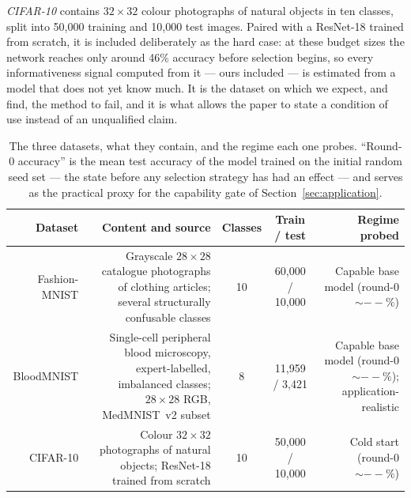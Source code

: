 \documentclass[a4paper,fleqn,longmktitle]{cas-sc}
\providecommand{\FmnistRoundZero}{--}\providecommand{\BloodRoundZero}{--}
\providecommand{\CifarRoundZero}{--}\providecommand{\CifarAccLow}{--}
\begin{document}
\emph{CIFAR-10} \citep{krizhevsky2009} contains $32\times32$ colour
photographs of natural objects in ten classes, split into 50,000
training and 10,000 test images. Paired with a ResNet-18
\citep{he2016} trained from scratch, it is included deliberately as the
hard case: at these budget sizes the network reaches only around 46\%
accuracy before selection begins, so every informativeness signal
computed from it --- ours included --- is estimated from a model that
does not yet know much. It is the dataset on which we expect, and
find, the method to fail, and it is what allows the paper to state a
condition of use instead of an unqualified claim.

\begin{table}[pos=htbp]
\centering\small
\caption{The three datasets, what they contain, and the regime each one
probes. ``Round-0 accuracy'' is the mean test accuracy of the model
trained on the initial random seed set --- the state before any
selection strategy has had an effect --- and serves as the practical
proxy for the capability gate of Section~\ref{sec:application}.}
\label{tab:datasets}
\begin{tabular}{@{}R{0.155}R{0.30}cc R{0.19}@{}}
\toprule
Dataset & Content and source & Classes & Train / test &
Regime probed \\
\midrule
Fashion-MNIST &
Grayscale $28\times28$ catalogue photographs of clothing articles;
several structurally confusable classes \citep{xiao2017} &
10 & 60,000 / 10,000 &
Capable base model (round-0 ${\sim}\FmnistRoundZero\%$) \\[3pt]
BloodMNIST &
Single-cell peripheral blood microscopy, expert-labelled, imbalanced
classes; $28\times28$ RGB, MedMNIST~v2 subset
\citep{yang2023,acevedo2020} &
8 & 11,959 / 3,421 &
Capable base model (round-0 ${\sim}\BloodRoundZero\%$); application-realistic \\[3pt]
CIFAR-10 &
Colour $32\times32$ photographs of natural objects; ResNet-18 trained
from scratch \citep{krizhevsky2009,he2016} &
10 & 50,000 / 10,000 &
Cold start (round-0 ${\sim}\CifarRoundZero\%$) \\
\bottomrule
\end{tabular}
\end{table}
\end{document}
